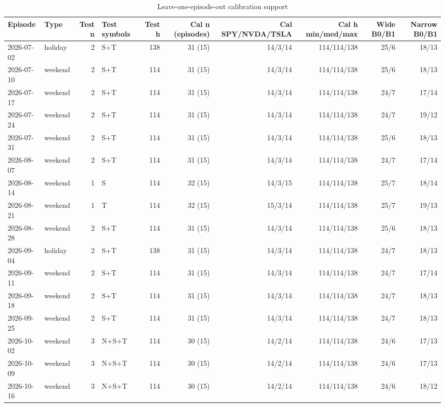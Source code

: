 \begin{table}[!ht]
\centering
\scriptsize
\caption{Leave-one-episode-out calibration support}
\label{tab:15}
\begin{adjustbox}{max width=\linewidth}
\begin{tabular}{@{}llrlrrrrrr@{}}
\toprule
Episode & Type & Test n & Test symbols & Test h & Cal n (episodes) & Cal SPY/NVDA/TSLA & Cal h min/med/max & Wide B0/B1 & Narrow B0/B1 \\
\midrule
2026-07-02 & holiday & 2 & S+T & 138 & 31 (15) & 14/3/14 & 114/114/138 & 25/6 & 18/13 \\
2026-07-10 & weekend & 2 & S+T & 114 & 31 (15) & 14/3/14 & 114/114/138 & 25/6 & 18/13 \\
2026-07-17 & weekend & 2 & S+T & 114 & 31 (15) & 14/3/14 & 114/114/138 & 24/7 & 17/14 \\
2026-07-24 & weekend & 2 & S+T & 114 & 31 (15) & 14/3/14 & 114/114/138 & 24/7 & 19/12 \\
2026-07-31 & weekend & 2 & S+T & 114 & 31 (15) & 14/3/14 & 114/114/138 & 25/6 & 18/13 \\
2026-08-07 & weekend & 2 & S+T & 114 & 31 (15) & 14/3/14 & 114/114/138 & 24/7 & 17/14 \\
2026-08-14 & weekend & 1 & S & 114 & 32 (15) & 14/3/15 & 114/114/138 & 25/7 & 18/14 \\
2026-08-21 & weekend & 1 & T & 114 & 32 (15) & 15/3/14 & 114/114/138 & 25/7 & 19/13 \\
2026-08-28 & weekend & 2 & S+T & 114 & 31 (15) & 14/3/14 & 114/114/138 & 25/6 & 18/13 \\
2026-09-04 & holiday & 2 & S+T & 138 & 31 (15) & 14/3/14 & 114/114/138 & 24/7 & 18/13 \\
2026-09-11 & weekend & 2 & S+T & 114 & 31 (15) & 14/3/14 & 114/114/138 & 24/7 & 17/14 \\
2026-09-18 & weekend & 2 & S+T & 114 & 31 (15) & 14/3/14 & 114/114/138 & 24/7 & 18/13 \\
2026-09-25 & weekend & 2 & S+T & 114 & 31 (15) & 14/3/14 & 114/114/138 & 24/7 & 18/13 \\
2026-10-02 & weekend & 3 & N+S+T & 114 & 30 (15) & 14/2/14 & 114/114/138 & 24/6 & 17/13 \\
2026-10-09 & weekend & 3 & N+S+T & 114 & 30 (15) & 14/2/14 & 114/114/138 & 24/6 & 17/13 \\
2026-10-16 & weekend & 3 & N+S+T & 114 & 30 (15) & 14/2/14 & 114/114/138 & 24/6 & 18/12 \\
\bottomrule
\end{tabular}

\end{adjustbox}
\end{table}
